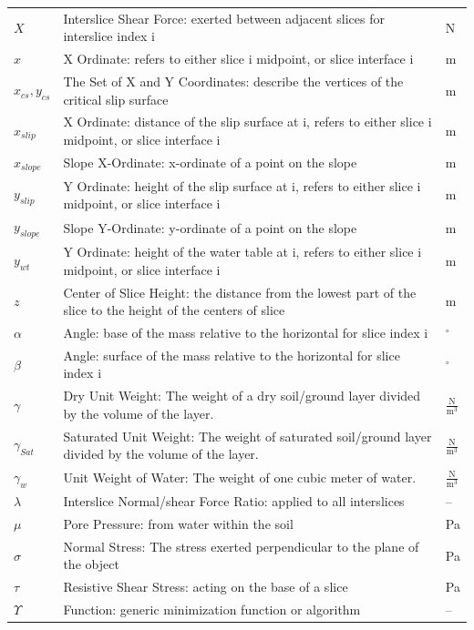 \documentclass[12pt]{article}
\begin{document}
\begin{longtabu}{l X[l] l}
$X$ & Interslice Shear Force: exerted between adjacent slices for interslice index i & N
\\
$x$ & X Ordinate: refers to either slice i midpoint, or slice interface i & m
\\
${x_{cs}},{y_{cs}}$ & The Set of X and Y Coordinates: describe the vertices of the critical slip surface & m
\\
${x_{slip}}$ & X Ordinate: distance of the slip surface at i, refers to either slice i midpoint, or slice interface i & m
\\
${x_{slope}}$ & Slope X-Ordinate: x-ordinate of a point on the slope & m
\\
${y_{slip}}$ & Y Ordinate: height of the slip surface at i, refers to either slice i midpoint, or slice interface i & m
\\
${y_{slope}}$ & Slope Y-Ordinate: y-ordinate of a point on the slope & m
\\
${y_{wt}}$ & Y Ordinate: height of the water table at i, refers to either slice i midpoint, or slice interface i & m
\\
$z$ & Center of Slice Height: the distance from the lowest part of the slice to the height of the centers of slice & m
\\
$α$ & Angle: base of the mass relative to the horizontal for slice index i & ${}^{\circ}$
\\
$β$ & Angle: surface of the mass relative to the horizontal for slice index i & ${}^{\circ}$
\\
$γ$ & Dry Unit Weight: The weight of a dry soil/ground layer divided by the volume of the layer. & $\frac{\text{N}}{\text{m}^{3}}$
\\
${γ_{Sat}}$ & Saturated Unit Weight: The weight of saturated soil/ground layer divided by the volume of the layer. & $\frac{\text{N}}{\text{m}^{3}}$
\\
${γ_{w}}$ & Unit Weight of Water: The weight of one cubic meter of water. & $\frac{\text{N}}{\text{m}^{3}}$
\\
$λ$ & Interslice Normal/shear Force Ratio: applied to all interslices & --
\\
$μ$ & Pore Pressure: from water within the soil & Pa
\\
$σ$ & Normal Stress: The stress exerted perpendicular to the plane of the object & Pa
\\
$τ$ & Resistive Shear Stress: acting on the base of a slice & Pa
\\
$Υ$ & Function: generic minimization function or algorithm & --
\\

\end{longtabu}
\end{document}

